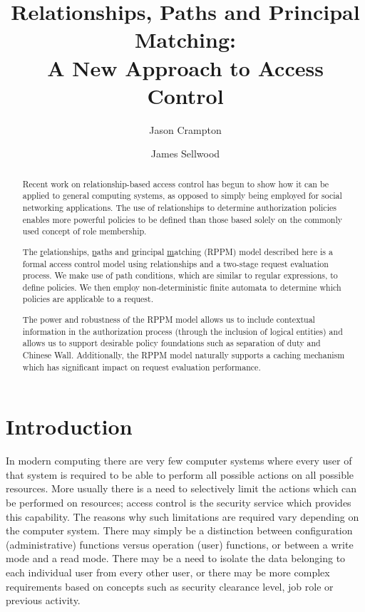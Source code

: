 \documentclass{article}
\begin{document}
\title{Relationships, Paths and Principal Matching:\\A New Approach to Access Control}

\author{Jason Crampton}
\author{James Sellwood}


\maketitle
\begin{abstract}
  Recent work on relationship-based access control has begun to show how it can be applied to general computing systems, as opposed to simply being employed for social networking applications. The use of relationships to determine authorization policies enables more powerful policies to be defined than those based solely on the commonly used concept of role membership.

  The \underline{r}elationships, \underline{p}aths and \underline{p}rincipal \underline{m}atching (RPPM) model described here is a formal access control model using relationships and a two-stage request evaluation process. We make use of path conditions, which are similar to regular expressions, to define policies. We then employ non-deterministic finite automata to determine which policies are applicable to a request.

  The power and robustness of the RPPM model allows us to include contextual information in the authorization process (through the inclusion of logical entities) and allows us to support desirable policy foundations such as separation of duty and Chinese Wall. Additionally, the RPPM model naturally supports a caching mechanism which has significant impact on request evaluation performance.
\end{abstract}


\section{Introduction}\label{sec:intro}
In modern computing there are very few computer systems where every user of that system is required to be able to perform all possible actions on all possible resources.
More usually there is a need to selectively limit the actions which can be performed on resources; access control is the security service which provides this capability.
The reasons why such limitations are required vary depending on the computer system.
There may simply be a distinction between configuration (administrative) functions versus operation (user) functions, or between a write mode and a read mode.
There may be a need to isolate the data belonging to each individual user from every other user, or there may be more complex requirements based on concepts such as security clearance level, job role or previous activity.
\end{document}
